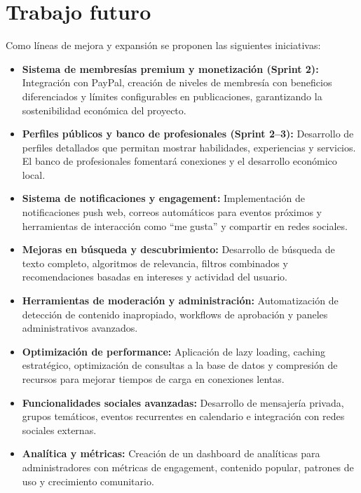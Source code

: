 \section{Trabajo futuro}
Como líneas de mejora y expansión se proponen las siguientes iniciativas:

\begin{itemize}
    \item \textbf{Sistema de membresías premium y monetización (Sprint 2):} Integración con PayPal, creación de niveles de membresía con beneficios diferenciados y límites configurables en publicaciones, garantizando la sostenibilidad económica del proyecto.
    
    \item \textbf{Perfiles públicos y banco de profesionales (Sprint 2–3):} Desarrollo de perfiles detallados que permitan mostrar habilidades, experiencias y servicios. El banco de profesionales fomentará conexiones y el desarrollo económico local.
    
    \item \textbf{Sistema de notificaciones y engagement:} Implementación de notificaciones push web, correos automáticos para eventos próximos y herramientas de interacción como “me gusta” y compartir en redes sociales.
    
    \item \textbf{Mejoras en búsqueda y descubrimiento:} Desarrollo de búsqueda de texto completo, algoritmos de relevancia, filtros combinados y recomendaciones basadas en intereses y actividad del usuario.
    
    \item \textbf{Herramientas de moderación y administración:} Automatización de detección de contenido inapropiado, workflows de aprobación y paneles administrativos avanzados.
    
    \item \textbf{Optimización de performance:} Aplicación de lazy loading, caching estratégico, optimización de consultas a la base de datos y compresión de recursos para mejorar tiempos de carga en conexiones lentas.
    
    \item \textbf{Funcionalidades sociales avanzadas:} Desarrollo de mensajería privada, grupos temáticos, eventos recurrentes en calendario e integración con redes sociales externas.
    
    \item \textbf{Analítica y métricas:} Creación de un dashboard de analíticas para administradores con métricas de engagement, contenido popular, patrones de uso y crecimiento comunitario.
\end{itemize}
